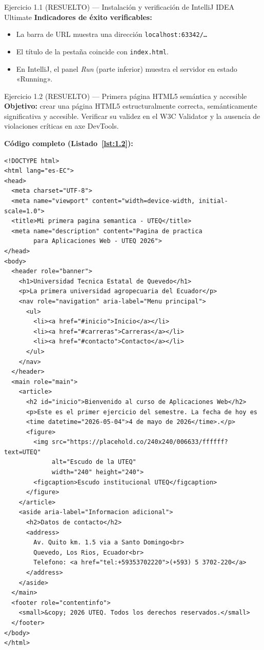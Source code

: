 \begin{cajaejercicio}{Ejercicio 1.1 (RESUELTO) --- Instalación y verificación de IntelliJ IDEA Ultimate}
\textbf{Indicadores de éxito verificables:}
\begin{itemize}
\item La barra de URL muestra una dirección \texttt{localhost:63342/\dots}
\item El título de la pestaña coincide con \texttt{index.html}.
\item En IntelliJ, el panel \emph{Run} (parte inferior) muestra el
servidor en estado «Running».
\end{itemize}
\end{cajaejercicio}

\begin{cajaejercicio}{Ejercicio 1.2 (RESUELTO) --- Primera página HTML5 semántica y accesible}
\textbf{Objetivo:} crear una página HTML5 estructuralmente correcta,
semánticamente significativa y accesible. Verificar su validez en el
W3C Validator y la ausencia de violaciones críticas en axe DevTools.

\textbf{Código completo (Listado~\ref{lst:1.2}):}

\begin{lstlisting}[style=html,caption={index.html (Ejercicio 1.2)},label=lst:1.2]
<!DOCTYPE html>
<html lang="es-EC">
<head>
  <meta charset="UTF-8">
  <meta name="viewport" content="width=device-width, initial-scale=1.0">
  <title>Mi primera pagina semantica - UTEQ</title>
  <meta name="description" content="Pagina de practica
        para Aplicaciones Web - UTEQ 2026">
</head>
<body>
  <header role="banner">
    <h1>Universidad Tecnica Estatal de Quevedo</h1>
    <p>La primera universidad agropecuaria del Ecuador</p>
    <nav role="navigation" aria-label="Menu principal">
      <ul>
        <li><a href="#inicio">Inicio</a></li>
        <li><a href="#carreras">Carreras</a></li>
        <li><a href="#contacto">Contacto</a></li>
      </ul>
    </nav>
  </header>
  <main role="main">
    <article>
      <h2 id="inicio">Bienvenido al curso de Aplicaciones Web</h2>
      <p>Este es el primer ejercicio del semestre. La fecha de hoy es
      <time datetime="2026-05-04">4 de mayo de 2026</time>.</p>
      <figure>
        <img src="https://placehold.co/240x240/006633/ffffff?text=UTEQ"
             alt="Escudo de la UTEQ"
             width="240" height="240">
        <figcaption>Escudo institucional UTEQ</figcaption>
      </figure>
    </article>
    <aside aria-label="Informacion adicional">
      <h2>Datos de contacto</h2>
      <address>
        Av. Quito km. 1.5 via a Santo Domingo<br>
        Quevedo, Los Rios, Ecuador<br>
        Telefono: <a href="tel:+59353702220">(+593) 5 3702-220</a>
      </address>
    </aside>
  </main>
  <footer role="contentinfo">
    <small>&copy; 2026 UTEQ. Todos los derechos reservados.</small>
  </footer>
</body>
</html>
\end{lstlisting}


\end{cajaejercicio}
